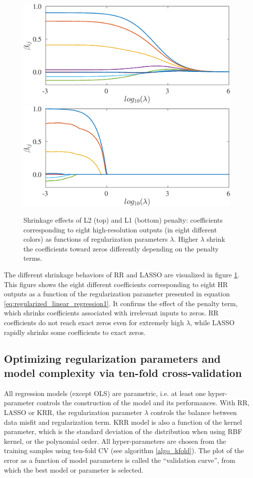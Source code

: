 \begin{figure}[t]
\centering
	\includegraphics[width=0.8\columnwidth]{./images/regression/RR_coeffs_lambda.eps}
	\includegraphics[width=0.8\columnwidth]{./images/regression/Lasso_coeffs_lambda.eps}
	\caption{\label{fig:coeffs_lambda} Shrinkage effects of L2 (top) and L1 (bottom) penalty: coefficients corresponding to eight high-resolution outputs (in eight different colors) as functions of regularization parameters $ \lambda $. Higher $ \lambda $ shrink the coefficients toward zeros differently depending on the penalty terms.}
\end{figure}

The different shrinkage behaviors of RR and LASSO are visualized in figure \ref{fig:coeffs_lambda}. This figure shows the eight different coefficients corresponding to eight HR outputs as a function of the regularization parameter presented in equation \ref{eq:regularized_linear_regression1}. It confirms the effect of the penalty term, which shrinks coefficients associated with irrelevant inputs to zeros. RR coefficients do not reach exact zeros even for extremely high $ \lambda $, while LASSO rapidly shrinks some coefficients to exact zeros.

\subsection{Optimizing regularization parameters and model complexity via ten-fold cross-validation}	

All regression models (except OLS) are parametric, i.e. at least one hyper-parameter controls the construction of the model and its performances. With RR, LASSO or KRR, the regularization parameter $ \lambda $ controls the balance between data misfit and regularization term. KRR model is also a function of the kernel parameter, which is the standard deviation of the distribution when using RBF kernel, or the polynomial order. All hyper-parameters are chosen from the training samples using ten-fold CV (see algorithm \ref{algo_kfold}). The plot of the error as a function of model parameters is called the ``validation curve'', from which the best model or parameter is selected.


